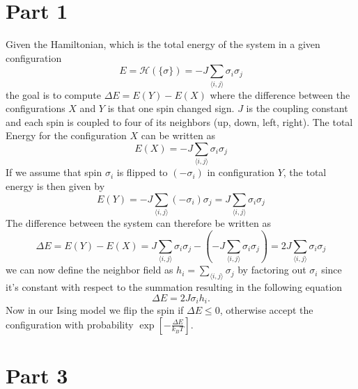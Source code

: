 \section*{Part 1}
Given the Hamiltonian, which is the total energy of the system in a given configuration
\begin{equation}
	E=\mathcal{H}(\{\sigma\})=-J \sum_{\langle i, j\rangle} \sigma_i \sigma_j
\end{equation}
the goal is to compute $\Delta E = E(Y) - E(X)$ where the difference between the configurations $X$ and $Y$ is that one spin changed sign.
$J$ is the coupling constant and each spin is coupled to four of its neighbors (up, down, left, right). \newline
\newline
The total Energy for the configuration $X$ can be written as
\begin{equation}
	E(X)=-J \sum_{\langle i, j\rangle} \sigma_i \sigma_j
\end{equation}
If we assume that spin $\sigma_i$ is flipped  to $(-\sigma_i)$ in configuration $Y$, the total energy is then given by
\begin{equation}
	E(Y)=-J \sum_{\langle i, j\rangle} (-\sigma_i) \sigma_j = J \sum_{\langle i, j\rangle} \sigma_i \sigma_j
\end{equation}
The difference between the system can therefore be written as
\begin{equation}
	\Delta E = E(Y) - E(X) = J \sum_{\langle i, j\rangle} \sigma_i \sigma_j - (-J \sum_{\langle i, j\rangle} \sigma_i \sigma_j) =  2J \sum_{\langle i, j\rangle} \sigma_i \sigma_j  
\end{equation}
we can now define the neighbor field as $h_i = \sum_{\langle i, j\rangle} \sigma_j$ by factoring out $\sigma_i$ since it's constant with respect to the summation resulting in the following equation
\begin{equation}
	\Delta E = 2J\sigma_i h_i.
\end{equation}
Now in our Ising model we flip the spin if $\Delta E \leq 0$, otherwise accept the configuration with probability $\exp \left[ - \displaystyle\frac{\Delta E}{k_B T}\right]$. 

\section*{Part 3}
